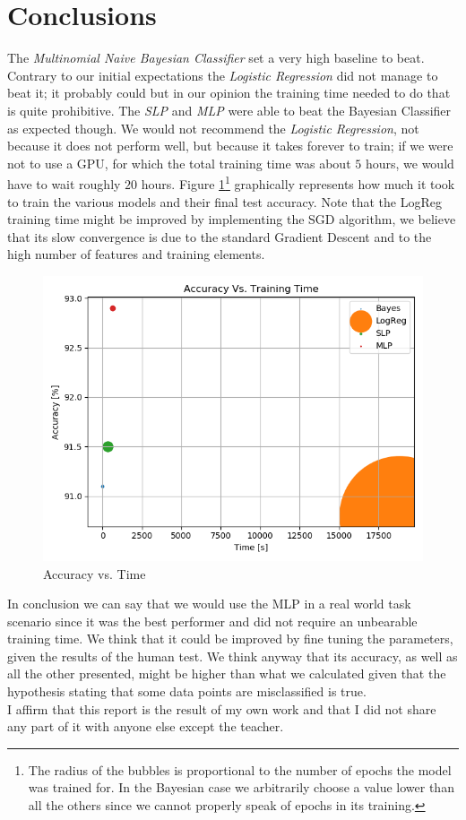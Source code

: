 \documentclass[10pt,a4paper]{report}
\begin{document}
\section{Conclusions}
The \textit{Multinomial Naive Bayesian Classifier} set a very high baseline to beat. Contrary to our initial expectations the \textit{Logistic Regression} did not manage to beat it; it probably could but in our opinion the training time needed to do that is quite prohibitive. The \textit{SLP} and \textit{MLP} were able to beat the Bayesian Classifier as expected though. We would not recommend the \textit{Logistic Regression}, not because it does not perform well, but because it takes forever to train; if we were not to use a GPU, for which the total training time was about $5$ hours, we would have to wait roughly $20$ hours. Figure \ref{fig:acc_time}\footnote{The radius of the bubbles is proportional to the number of epochs the model was trained for. In the Bayesian case we arbitrarily choose a value lower than all the others since we cannot properly speak of epochs in its training.} graphically represents how much it took to train the various models and their final test accuracy. Note that the LogReg training time might be improved by implementing the SGD algorithm, we believe that its slow convergence is due to the standard Gradient Descent and to the high number of features and training elements.
\begin{figure}[!ht]
\centering
\includegraphics[width=0.5\linewidth]{acc_vs_time.png}
\caption{Accuracy vs. Time}
\label{fig:acc_time}
\end{figure}
In conclusion we can say that we would use the MLP in a real world task scenario since it was the best performer and did not require an unbearable training time. We think that it could be improved by fine tuning the parameters, given the results of the human test. We think anyway that its accuracy, as well as all the other presented, might be higher than what we calculated given that the hypothesis stating that some data points are misclassified is true.
\vspace*{\fill}
\\
I affirm that this report is the result of my own work and that I did not share any part of it with anyone else except the teacher.
\\
\end{document}

